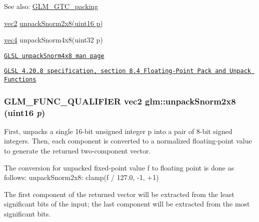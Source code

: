 \begin{Desc}
\item[See also:]\hyperlink{group__gtc__packing}{GLM\_\-GTC\_\-packing} 

\hyperlink{group__core__types_ga1618f51db67eaa145db101d8c8431d8}{vec2} \hyperlink{group__gtc__packing_g27f30f0281b88e152b0895f5e2ead878}{unpackSnorm2x8(uint16 p)} 

\hyperlink{group__core__types_g5881b1b022d7fd1b7218f5916532dd02}{vec4} unpackSnorm4x8(uint32 p) 

\href{http://www.opengl.org/sdk/docs/manglsl/xhtml/unpackSnorm4x8.xml}{\tt GLSL unpackSnorm4x8 man page} 

\href{http://www.opengl.org/registry/doc/GLSLangSpec.4.20.8.pdf}{\tt GLSL 4.20.8 specification, section 8.4 Floating-Point Pack and Unpack Functions} \end{Desc}
\hypertarget{group__gtc__packing_g27f30f0281b88e152b0895f5e2ead878}{
\subsubsection[unpackSnorm2x8]{\setlength{\rightskip}{0pt plus 5cm}GLM\_\-FUNC\_\-QUALIFIER vec2 glm::unpackSnorm2x8 (uint16 {\em p})}}
\label{group__gtc__packing_g27f30f0281b88e152b0895f5e2ead878}


First, unpacks a single 16-bit unsigned integer p into a pair of 8-bit signed integers. Then, each component is converted to a normalized floating-point value to generate the returned two-component vector.

The conversion for unpacked fixed-point value f to floating point is done as follows: unpackSnorm2x8: clamp(f / 127.0, -1, +1)

The first component of the returned vector will be extracted from the least significant bits of the input; the last component will be extracted from the most significant bits.

